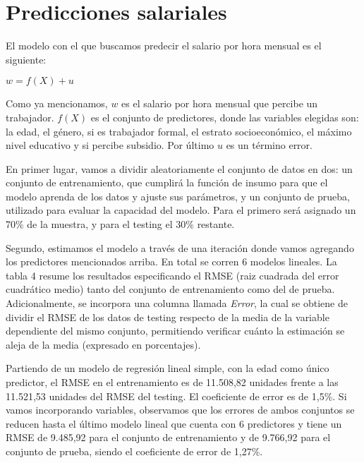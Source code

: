 \documentclass[11pt,oneside]{article}
\begin{document}
	\newpage
	
	
	
	\section{Predicciones salariales}
	
	El modelo con el que buscamos predecir el salario por hora mensual es el siguiente:
	
	\begin{center}
		$w = f(X) + u$
	\end{center}
	
	Como ya mencionamos, $w$ es el salario por hora mensual que percibe un trabajador. $f(X)$ es el conjunto de predictores, donde las variables elegidas son: la edad, el género, si es trabajador formal, el estrato socioeconómico, el máximo nivel educativo y si percibe subsidio. Por último $u$ es un término error.
	
	En primer lugar, vamos a dividir aleatoriamente el conjunto de datos en dos: un conjunto de entrenamiento, que cumplirá la función de insumo para que el modelo aprenda de los datos y ajuste sus parámetros, y un conjunto de prueba, utilizado para evaluar la capacidad del modelo. Para el primero será asignado un 70\% de la muestra, y para el testing el 30\% restante.
	
	Segundo, estimamos el modelo a través de una iteración donde vamos agregando los predictores mencionados arriba. En total se corren 6 modelos lineales. La tabla 4 resume los resultados especificando el RMSE (raiz cuadrada del error cuadrático medio) tanto del conjunto de entrenamiento como del de prueba. Adicionalmente, se incorpora una columna llamada \textit{Error}, la cual se obtiene de dividir el RMSE de los datos de testing respecto de la media de la variable dependiente del mismo conjunto, permitiendo verificar cuánto la estimación se aleja de la media (expresado en porcentajes). 
	
	
	Partiendo de un modelo de regresión lineal simple, con la edad como único predictor, el RMSE en el entrenamiento es de 11.508,82 unidades frente a las 11.521,53 unidades del RMSE del testing. El coeficiente de error es de 1,5\%. Si vamos incorporando variables, observamos que los errores de ambos conjuntos se reducen hasta el último modelo lineal que cuenta con 6 predictores y tiene un RMSE de 9.485,92 para el conjunto de entrenamiento y de 9.766,92 para el conjunto de prueba, siendo el coeficiente de error de 1,27\%. 
	
\end{document}
